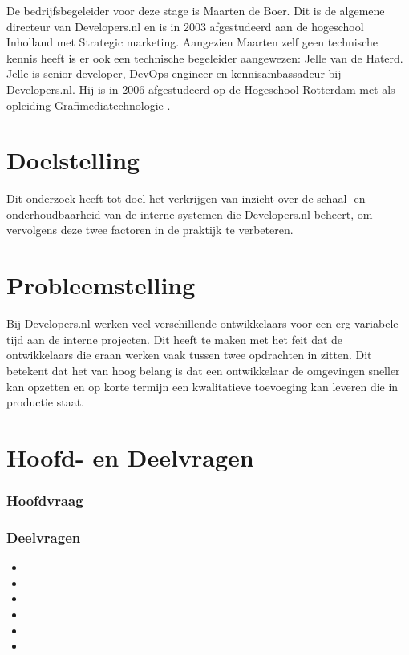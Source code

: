 De bedrijfsbegeleider voor deze stage is Maarten de Boer. Dit is de algemene directeur van Developers.nl en is in 2003 afgestudeerd aan de hogeschool Inholland met Strategic marketing. Aangezien Maarten zelf geen technische kennis heeft is er ook een technische begeleider aangewezen: Jelle van de Haterd. Jelle is senior developer, DevOps engineer en kennisambassadeur bij Developers.nl. Hij is in 2006 afgestudeerd op de Hogeschool Rotterdam met als opleiding Grafimediatechnologie \parencite{Afstudeervoorstel}.

\section{Doelstelling}
Dit onderzoek heeft tot doel het verkrijgen van inzicht over de schaal- en onderhoudbaarheid van de interne systemen die Developers.nl beheert, om vervolgens deze twee factoren in de praktijk te verbeteren.

\section{Probleemstelling}
Bij Developers.nl werken veel verschillende ontwikkelaars voor een erg variabele tijd aan de interne projecten. Dit heeft te maken met het feit dat de ontwikkelaars die eraan werken vaak tussen twee opdrachten in zitten. Dit betekent dat het van hoog belang is dat een ontwikkelaar de omgevingen sneller kan opzetten en op korte termijn een kwalitatieve toevoeging kan leveren die in productie staat.

\section{Hoofd- en Deelvragen}
\subsubsection{Hoofdvraag}
\hoofdvraagname

\subsubsection{Deelvragen}
\begin{itemize}
	\item \deelverwachtingen
	\item \deeltechnieken
	\item \deelhuidig
	\item \deelverbetering
	\item \deelimplementatie
	\item \deelrequirements
\end{itemize}

